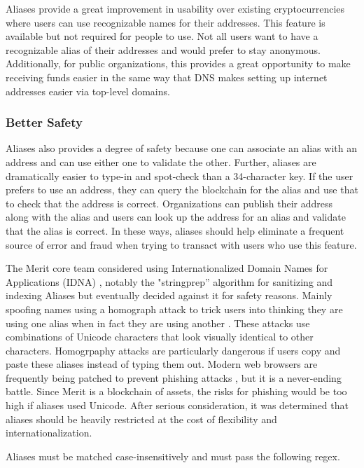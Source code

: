\documentclass{article}
\begin{document}
Aliases provide a great improvement in usability over existing cryptocurrencies 
where users can use recognizable names for their addresses. This feature is
available but not required for people to use. Not all users want to have a
recognizable alias of their addresses and would prefer to stay anonymous.
Additionally, for public organizations, this provides a great opportunity to make
receiving funds easier in the same way that DNS makes setting up internet addresses easier
via top-level domains.

\subsubsection{Better Safety}

Aliases also provides a degree of safety because one can associate an alias with an address
and can use either one to validate the other. Further, aliases are dramatically easier to 
type-in and spot-check than a 34-character key.  If the user prefers to use an address, they
can query the blockchain for the alias and use that to check that the address
is correct. Organizations can publish their address along with the alias and
users can look up the address for an alias and validate that the alias is correct.
In these ways, aliases should help eliminate a frequent source of error and fraud when trying to transact
with users who use this feature.

The Merit core team considered using Internationalized Domain Names for Applications (IDNA) \cite{IDNA},
notably the "stringprep'' \cite{stringprep} algorithm for sanitizing and
indexing Aliases but eventually decided against it for safety reasons. Mainly
spoofing names using a homograph attack to trick users into thinking they are
using one alias when in fact they are using another \cite{homograph}. These attacks
use combinations of Unicode characters that look visually identical to other characters.
Homogrpaphy attacks are particularly dangerous if users copy and paste these aliases
instead of typing them out. Modern web browsers are frequently being patched to prevent
phishing attacks \cite{phishing}, but it is a never-ending battle. Since Merit
is a blockchain of assets, the risks for phishing
would be too high if aliases used Unicode. After serious consideration, it was determined that aliases 
should be heavily restricted at the cost of flexibility and internationalization.

Aliases must be matched case-insensitively and must pass the following \gls{regex}.
\end{document}
